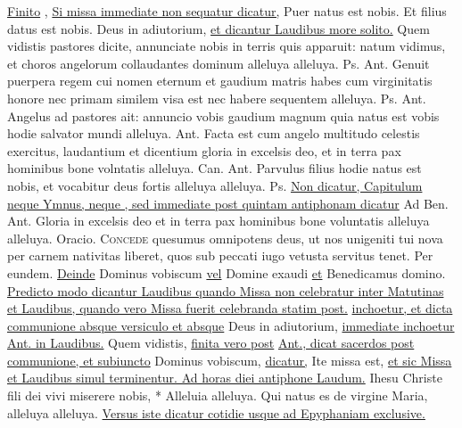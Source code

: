 \begin{multicols*}{2}
 \ul{Finito} , \ul{Si missa immediate non sequatur dicatur,} \V Puer natus est nobis. \R Et filius datus est nobis. Deus in adiutorium, \ul{et dicantur Laudibus more solito.}
 Quem vidistis pastores dicite, annunciate nobis in terris quis apparuit: natum vidimus, et choros angelorum collaudantes dominum alleluya alleluya. {\color{Red} Ps.}  {\color{Red} Ant.} Genuit puerpera regem cui nomen eternum et gaudium matris habes cum virginitatis honore nec primam similem visa est nec habere sequentem alleluya. {\color{Red} Ps.}  {\color{Red} Ant.} Angelus ad pastores ait: annuncio vobis gaudium magnum quia natus est vobis hodie salvator mundi alleluya.  {\color{Red} Ant.} Facta est cum angelo multitudo celestis exercitus, laudantium et dicentium gloria in excelsis deo, et in terra pax hominibus bone volntatis alleluya. {\color{Red} Can.}  {\color{Red} Ant.} Parvulus filius hodie natus est nobis, et vocabitur deus fortis alleluya alleluya. {\color{Red} Ps.} 
\newline \ul{Non dicatur, Capitulum neque Ymnus, neque \Vbar , sed immediate post quintam antiphonam dicatur} {\color{Red} Ad Ben. Ant.} Gloria in excelsis deo et in terra pax hominibus bone voluntatis alleluya alleluya. {\color{Red} Oracio.}
\lettrine[lines=2]{\zallmancaps \color{Blue} C}{oncede} \hypertarget{concede-nativitas}{quesumus} omnipotens deus, ut nos unigeniti tui nova per carnem nativitas liberet, quos sub peccati iugo vetusta servitus tenet. Per eundem.
\newline \ul{Deinde} Dominus vobiscum \ul{vel} Domine exaudi \ul{et} Benedicamus domino. \ul{Predicto modo dicantur Laudibus quando Missa non celebratur inter Matutinas et Laudibus, quando vero Missa fuerit celebranda statim post.}  \ul{inchoetur, et dicta communione absque versiculo et absque} Deus in adiutorium, \ul{immediate inchoetur Ant. in Laudibus.} Quem vidistis, \ul{finita vero post}  \ul{Ant., dicat sacerdos post communione, et subiuncto} Dominus vobiscum, \ul{dicatur,} Ite missa est, \ul{et sic Missa et Laudibus simul terminentur. Ad horas diei antiphone Laudum.}
 \R Ihesu Christe fili dei vivi miserere nobis, * Alleluia alleluya. \V Qui natus es de virgine Maria, alleluya alleluya. \ul{Versus iste dicatur cotidie usque ad Epyphaniam exclusive.}

\end{multicols*}
